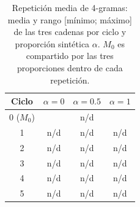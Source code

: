 
\begin{table}[ht]
\centering
\footnotesize
\begin{tabular}{c c c c}
\hline
Ciclo & $\alpha=0$ & $\alpha=0.5$ & $\alpha=1$ \\
\hline
0 ($M_0$) & \multicolumn{3}{c}{n/d} \\
1 & n/d & n/d & n/d \\
2 & n/d & n/d & n/d \\
3 & n/d & n/d & n/d \\
4 & n/d & n/d & n/d \\
5 & n/d & n/d & n/d \\
\hline
\end{tabular}
\caption{Repetición media de 4-gramas: media y rango [mínimo; máximo] de las tres cadenas por ciclo y proporción sintética $\alpha$. $M_0$ es compartido por las tres proporciones dentro de cada repetición.}
\label{tab:medias_repeat_4_mean}
\end{table}
